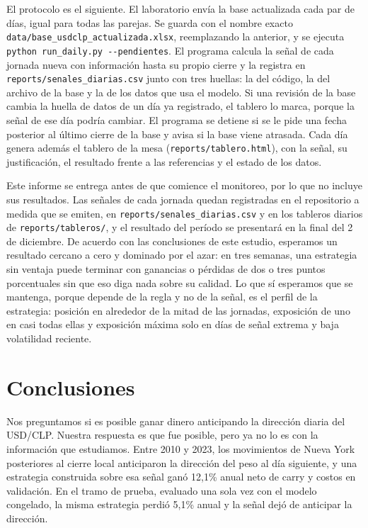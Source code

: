\documentclass[11pt,a4paper]{article}
\begin{document}
El protocolo es el siguiente. El laboratorio envía la base actualizada cada par de días, igual para todas las parejas. Se guarda con el nombre exacto \texttt{data/base\_usdclp\_actualizada.xlsx}, reemplazando la anterior, y se ejecuta \texttt{python run\_daily.py -{}-pendientes}. El programa calcula la señal de cada jornada nueva con información hasta su propio cierre y la registra en \texttt{reports/senales\_diarias.csv} junto con tres huellas: la del código, la del archivo de la base y la de los datos que usa el modelo. Si una revisión de la base cambia la huella de datos de un día ya registrado, el tablero lo marca, porque la señal de ese día podría cambiar. El programa se detiene si se le pide una fecha posterior al último cierre de la base y avisa si la base viene atrasada. Cada día genera además el tablero de la mesa (\texttt{reports/tablero.html}), con la señal, su justificación, el resultado frente a las referencias y el estado de los datos.

Este informe se entrega antes de que comience el monitoreo, por lo que no incluye sus resultados. Las señales de cada jornada quedan registradas en el repositorio a medida que se emiten, en \texttt{reports/senales\_diarias.csv} y en los tableros diarios de \texttt{reports/tableros/}, y el resultado del período se presentará en la final del 2 de diciembre. De acuerdo con las conclusiones de este estudio, esperamos un resultado cercano a cero y dominado por el azar: en tres semanas, una estrategia sin ventaja puede terminar con ganancias o pérdidas de dos o tres puntos porcentuales sin que eso diga nada sobre su calidad. Lo que sí esperamos que se mantenga, porque depende de la regla y no de la señal, es el perfil de la estrategia: posición en alrededor de la mitad de las jornadas, exposición de uno en casi todas ellas y exposición máxima solo en días de señal extrema y baja volatilidad reciente.


\section{Conclusiones}\label{sec:conclusiones}
Nos preguntamos si es posible ganar dinero anticipando la dirección diaria del USD/CLP. Nuestra respuesta es que fue posible, pero ya no lo es con la información que estudiamos. Entre 2010 y 2023, los movimientos de Nueva York posteriores al cierre local anticiparon la dirección del peso al día siguiente, y una estrategia construida sobre esa señal ganó 12,1\% anual neto de carry y costos en validación. En el tramo de prueba, evaluado una sola vez con el modelo congelado, la misma estrategia perdió 5,1\% anual y la señal dejó de anticipar la dirección.
\end{document}
